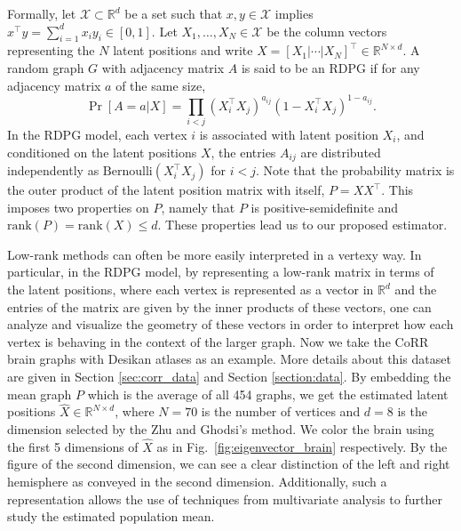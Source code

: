 \documentclass[10pt,letterpaper]{article}
\renewcommand{\Re}{\mathbb{R}}
\renewcommand{\hat}{\widehat}
\begin{document}
Formally, let $\mathcal{X} \subset \Re^d$ be a set such that $x, y \in \mathcal{X}$ implies $x^{\top} y =\sum_{i = 1}^d x_i y_i \in [0, 1]$.
Let $X_1,\dotsc,X_N\in \mathcal{X}$ be the column vectors representing the $N$ latent positions and write $X = [X_1|\cdots|X_N]^{\top} \in \Re^{N \times d}$.
A random graph $G$ with adjacency matrix $A$ is said to be an RDPG if for any adjacency matrix $a$ of the same size,
\[
    \Pr[A = a|X] = \prod_{i<j} (X_i^{\top} X_j)^{a_{ij}} ( 1 - X_i^{\top} X_j)^{1 - a_{ij}}.
\]
In the RDPG model, each vertex $i$ is associated with latent position $X_i$, and conditioned on the latent positions $X$, the entries $A_{ij}$ are distributed independently as $ \text{Bernoulli}(X_i^{\top} X_j)$ for $i<j$.
Note that the probability matrix is the outer product of the latent position matrix with itself, $P = X X^{\top}$.
This imposes two properties on $P$, namely that $P$ is positive-semidefinite and $\mathrm{rank}(P)=\mathrm{rank}(X)\leq d$.
These properties lead us to our proposed estimator.


Low-rank methods can often be more easily interpreted {\color{red} in a vertexy way}.
 In particular, in the RDPG model, by representing a low-rank matrix in terms of the latent positions, where each vertex is represented as a vector in $\Re^d$ and the entries of the matrix are given by the inner products of these vectors, one can analyze and visualize the geometry of these vectors in order to interpret how each vertex is behaving in the context of the larger graph. 
Now we take the CoRR brain graphs with Desikan atlases as an example. More details about this dataset are given in Section \ref{sec:corr_data} and Section \ref{section:data}. By embedding the mean graph $P$ which is the average of all 454 graphs, we get the estimated latent positions $\hat{X} \in \mathbb{R}^{N\times d}$, where $N=70$ is the number of vertices and $d = 8$ is the dimension selected by the Zhu and Ghodsi's method.
We color the brain using the first 5 dimensions of $\hat{X}$ as in Fig.~\ref{fig:eigenvector_brain} respectively. By the figure of the second dimension, we can see a clear distinction of the left and right hemisphere as conveyed in the second dimension. Additionally, such a representation allows the use of techniques from multivariate analysis to further study the estimated population mean.
\end{document}
